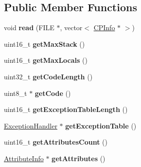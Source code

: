 \subsection*{Public Member Functions}
\begin{DoxyCompactItemize}
\item 
void {\bfseries read} (F\+I\+LE $\ast$, vector$<$ \hyperlink{classCPInfo}{C\+P\+Info} $\ast$ $>$)\hypertarget{classCodeAttribute_acb8378aad8421371b26442ffbf778de4}{}\label{classCodeAttribute_acb8378aad8421371b26442ffbf778de4}

\item 
uint16\+\_\+t {\bfseries get\+Max\+Stack} ()\hypertarget{classCodeAttribute_a9eb6a6b7bd7bd870f745bc089d407e45}{}\label{classCodeAttribute_a9eb6a6b7bd7bd870f745bc089d407e45}

\item 
uint16\+\_\+t {\bfseries get\+Max\+Locals} ()\hypertarget{classCodeAttribute_aa97ceb04d99e607389a4cf08b3b65db1}{}\label{classCodeAttribute_aa97ceb04d99e607389a4cf08b3b65db1}

\item 
uint32\+\_\+t {\bfseries get\+Code\+Length} ()\hypertarget{classCodeAttribute_ae365ff1b5fc98df49f3f61379d59978f}{}\label{classCodeAttribute_ae365ff1b5fc98df49f3f61379d59978f}

\item 
uint8\+\_\+t $\ast$ {\bfseries get\+Code} ()\hypertarget{classCodeAttribute_a713d99a501cb88c344013b5820ea6e8b}{}\label{classCodeAttribute_a713d99a501cb88c344013b5820ea6e8b}

\item 
uint16\+\_\+t {\bfseries get\+Exception\+Table\+Length} ()\hypertarget{classCodeAttribute_a4a1408612b357305d2c27673d8e18124}{}\label{classCodeAttribute_a4a1408612b357305d2c27673d8e18124}

\item 
\hyperlink{classExceptionHandler}{Exception\+Handler} $\ast$ {\bfseries get\+Exception\+Table} ()\hypertarget{classCodeAttribute_a7905efeeb4bbdd57cc07605757372db5}{}\label{classCodeAttribute_a7905efeeb4bbdd57cc07605757372db5}

\item 
uint16\+\_\+t {\bfseries get\+Attributes\+Count} ()\hypertarget{classCodeAttribute_a795890e641c508602f2b842af5779fc6}{}\label{classCodeAttribute_a795890e641c508602f2b842af5779fc6}

\item 
\hyperlink{classAttributeInfo}{Attribute\+Info} $\ast$ {\bfseries get\+Attributes} ()\hypertarget{classCodeAttribute_a5f36ae9a19d451dbb7c1aedad06454ff}{}\label{classCodeAttribute_a5f36ae9a19d451dbb7c1aedad06454ff}

\end{DoxyCompactItemize}


